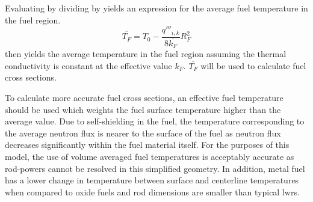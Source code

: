       Evaluating  by dividing  by
       yields an expression for the average fuel
      temperature in the fuel region.
      \begin{equation}
        \label{eq:tf_bar}
        \overline{T_F} = T_0 - \frac{q'''_{i,k}}{8 \overline{k_F}} R_F^2
      \end{equation}
       then yields the average temperature in the fuel region
      assuming the thermal conductivity is constant at the effective value
      $k_F$. $\overline{T_F}$ will be used to calculate fuel cross sections. 

      To calculate more accurate fuel cross sections, an effective fuel 
      temperature should be used which weights the fuel surface temperature 
      higher than the average value. Due to self-shielding in the fuel, the 
      temperature corresponding to the average neutron flux is nearer to the 
      surface of the fuel as neutron flux decreases significantly within the 
      fuel material itself. For the purposes of this model, the use of volume 
      averaged fuel temperatures is acceptably accurate as rod-powers cannot be 
      resolved in this simplified geometry. In addition, metal fuel has a lower 
      change in temperature between surface and centerline temperatures when 
      compared to oxide fuels and rod dimensions are smaller than typical 
      \glspl{lwr}.

